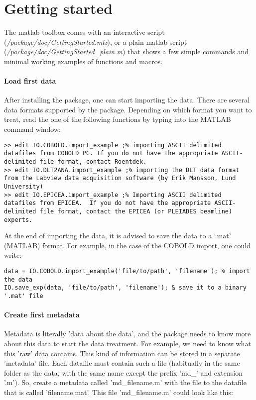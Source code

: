 \section{Getting started}
The matlab toolbox comes with an interactive script (\textit{/package/doc/GettingStarted.mlx}), or a plain matlab script (\textit{/package/doc/GettingStarted\_plain.m}) that shows a few simple commands and minimal working examples of functions and macros. 

\paragraph{Load first data}
After installing the package, one can start importing the data. There are several data formats supported by the package. Depending on which format you want to treat, read the one of the following functions by typing into the MATLAB command window:
\lstset{language=MATLAB}
\begin{lstlisting}
>> edit IO.COBOLD.import_example ;% importing ASCII delimited datafiles from COBOLD PC. If you do not have the appropriate ASCII-delimited file format, contact Roentdek.
>> edit IO.DLT2ANA.import_example ;% importing the DLT data format from the Labview data acquisition software (by Erik Mansson, Lund University)
>> edit IO.EPICEA.import_example ;% Importing ASCII delimited datafiles from EPICEA.  If you do not have the appropriate ASCII-delimited file format, contact the EPICEA (or PLEIADES beamline) experts.
\end{lstlisting}

At the end of importing the data, it is advised to save the data to a `.mat' (MATLAB) format. For example, in the case of the COBOLD import, one could write:

\begin{lstlisting}
data = IO.COBOLD.import_example('file/to/path', 'filename'); % import the data
IO.save_exp(data, 'file/to/path', 'filename'); & save it to a binary '.mat' file
\end{lstlisting}

\paragraph{Create first metadata}
Metadata is literally 'data about the data', and the package needs to know more about this data to start the data treatment. For example, we need to know what this 'raw' data contains. This kind of information can be stored in a separate 'metadata' file. Each datafile must contain such a file (habitually in the same folder as the data, with the same name except the prefix 'md\_' and extension '.m'). So, create a metadata called 'md\_filename.m' with the file to the datafile that is called 'filename.mat'. This file 'md\_filename.m' could look like this:

